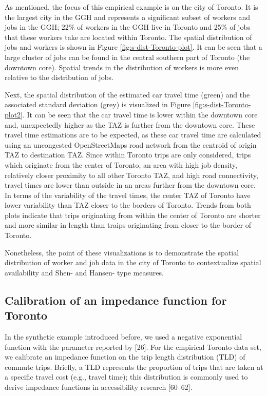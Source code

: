 \documentclass[10pt,letterpaper]{article}
\begin{document}
As mentioned, the focus of this empirical example is on the city of
Toronto. It is the largest city in the GGH and represents a significant
subset of workers and jobs in the GGH; 22\% of workers in the GGH live
in Toronto and 25\% of jobs that these workers take are located within
Toronto. The spatial distribution of jobs and workers is shown in Figure
\ref{fig:s-dist-Toronto-plot}. It can be seen that a large cluster of
jobs can be found in the central southern part of Toronto (the downtown
core). Spatial trends in the distribution of workers is more even
relative to the distribution of jobs.

Next, the spatial distribution of the estimated car travel time (green)
and the associated standard deviation (grey) is visualized in Figure
\ref{fig:s-dist-Toronto-plot2}. It can be seen that the car travel time
is lower within the downtown core and, unexpectedly higher as the TAZ is
further from the downtown core. These travel time estimations are to be
expected, as these car travel time are calculated using an uncongested
OpenStreetMaps road network from the centroid of origin TAZ to
destination TAZ. Since within Toronto trips are only considered, trips
which originate from the center of Toronto, an area with high job
density, relatively closer proximity to all other Toronto TAZ, and high
road connectivity, travel times are lower than outside in an areas
further from the downtown core. In terms of the variability of the
travel times, the center TAZ of Toronto have lower variability than TAZ
closer to the borders of Toronto. Trends from both plots indicate that
trips originating from within the center of Toronto are shorter and more
similar in length than traips originating from closer to the border of
Toronto.

Nonetheless, the point of these visualizations is to demonstrate the
spatial distribution of worker and job data in the city of Toronto to
contextualize spatial availability and Shen- and Hansen- type measures.

\hypertarget{calibration-of-an-impedance-function-for-toronto}{%
\subsection{Calibration of an impedance function for
Toronto}\label{calibration-of-an-impedance-function-for-toronto}}

In the synthetic example introduced before, we used a negative
exponential function with the parameter reported by {[}26{]}. For the
empirical Toronto data set, we calibrate an impedance function on the
trip length distribution (TLD) of commute trips. Briefly, a TLD
represents the proportion of trips that are taken at a specific travel
cost (e.g., travel time); this distribution is commonly used to derive
impedance functions in accessibility research {[}60--62{]}.
\end{document}
